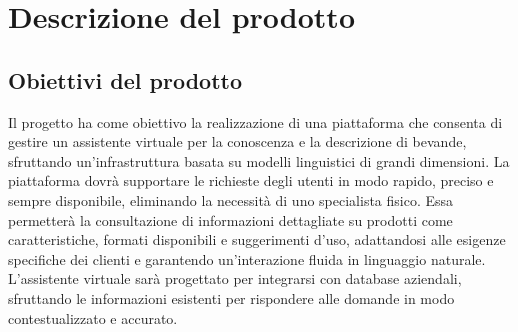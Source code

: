 \section{Descrizione del prodotto}

\subsection{Obiettivi del prodotto}
Il progetto ha come obiettivo la realizzazione di una piattaforma che consenta di 
gestire un assistente virtuale per la conoscenza e la descrizione di bevande, 
sfruttando un’infrastruttura basata su modelli linguistici di grandi dimensioni. 
La piattaforma dovrà supportare le richieste degli utenti in modo rapido, 
preciso e sempre disponibile, eliminando la necessità di uno specialista fisico. 
Essa permetterà la consultazione di informazioni dettagliate su prodotti come caratteristiche, 
formati disponibili e suggerimenti d’uso, adattandosi alle esigenze specifiche 
dei clienti e garantendo un’interazione fluida in linguaggio naturale. 
L’assistente virtuale sarà progettato per integrarsi con database aziendali, 
sfruttando le informazioni esistenti per rispondere alle domande in modo 
contestualizzato e accurato.

